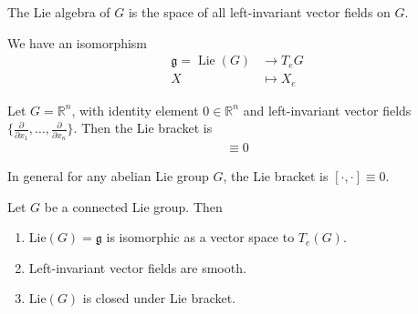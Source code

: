 \documentclass[12pt,a4paper]{article}
\theoremstyle{definition}
\theoremstyle{greenbox}
\newcommand{\R}{\mathbb{R}}
\begin{document}
    \begin{defn}
        The Lie algebra of $ G $ is the space of all left-invariant vector fields on $ G $. 
        
    \end{defn}
    We have an  isomorphism \begin{align*}
        \mathfrak{g}  = \operatorname{Lie}(G) &\to T_{e}G\\ 
        X &\mapsto X_{e}
    \end{align*}
    \begin{example}
        Let $ G = \R^{n} $, with identity element $ 0 \in \R^{n} $ and left-invariant vector fields $ \{ \frac{ \partial}{ \partial x_{1}}, \ldots, \frac{ \partial}{ \partial x_{n}}\} $. Then the Lie bracket is \begin{align*}
            [\cdot, \cdot ] \equiv 0
        \end{align*}
    \end{example}
    \begin{remark}
        In general for any abelian Lie group $ G $, the Lie bracket is $ [\cdot, \cdot ] \equiv 0 $.
    \end{remark}
    \begin{thm}
        Let $ G $ be a connected Lie group. Then \begin{enumerate}
            \item Lie$ (G)  = \mathfrak{g}$ is isomorphic as a vector space to $ T_{e}(G) $.
            \item Left-invariant vector fields are smooth. 
            \item Lie$ (G) $ is closed under Lie bracket. 
        \end{enumerate}
    \end{thm}
\end{document}
